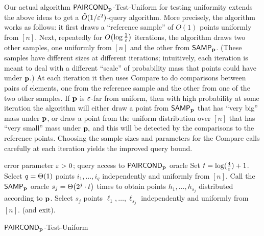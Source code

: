 Our actual algorithm {\sc ${\sf PAIRCOND}_{\mathbf{p}}$-Test-Uniform} for testing uniformity extends
the above ideas to get a $\tilde{O}(1/\varepsilon^2)$-query algorithm.
More precisely, the algorithm works as follows:
it first draws a ``reference sample'' of $O(1)$ points uniformly
from $[n]$.  Next, repeatedly for $\bigO{\log \frac{1}{\eps}}$ iterations,
the algorithm draws two other samples,
one uniformly from $[n]$ and the other from ${\sf SAMP}_{\mathbf{p}}$.
(These samples have different sizes at different iterations;
intuitively, each iteration is meant to deal with a different
``scale'' of probability mass that points could have under $\mathbf{p}$.)
At each iteration it then uses {\sc Compare} to
do comparisons between
pairs of elements, one from the reference sample and the other from one of the
two other samples.  If $\mathbf{p}$ is $\varepsilon$-far from uniform, then
with high probability at some iteration the algorithm will either
draw a point from ${\sf SAMP}_{\mathbf{p}}$ that has ``very big'' mass under $\mathbf{p}$, or
draw a point from the uniform distribution over $[n]$ that has
``very small'' mass under $\mathbf{p},$ and this will be detected by the
comparisons to the reference points.  Choosing the sample sizes
and parameters for the {\sc Compare} calls
carefully at each iteration yields the improved query bound.

\begin{algorithm}
\begin{algorithmic}[1]
\Require error parameter $\varepsilon > 0$; query access to ${\sf PAIRCOND}_{\mathbf{p}}$ oracle
\State Set $t = \log(\frac{4}{\varepsilon})+ 1$.
\State\label{st:unif} Select $q=\bigTheta{1}$ points $i_1,\dots,i_q$
independently and uniformly from $[n]$.
   \State \label{st:D}
Call the ${\sf SAMP}_{\mathbf{p}}$ oracle $s_j = \bigTheta{2^j\cdot t}$
times to obtain points $h_1,\dots,h_{s_j}$ distributed according
to $\mathbf{p}$.
   \State \label{st:unif2} Select $s_j $ points
       $\ell_1,\dots,\ell_{s_j}$ independently and uniformly from $[n].$
   \label{st:COND}
   \label{st:call-compare:unif}
      \State \Return \reject (and exit). \label{st:rej}
    \EndIf
    \EndFor
   \EndFor
\State \Return \accept
\end{algorithmic}\caption{\label{algo:testing-uniformity}\sc ${\sf PAIRCOND}_{\mathbf{p}}$-Test-Uniform}
\end{algorithm}




